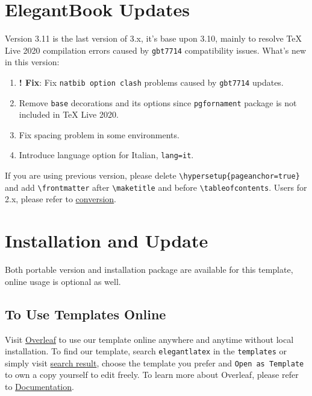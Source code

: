 \documentclass[11pt,fancy,twocol,twoside]{elegantbook}
\begin{document}
\section{ElegantBook Updates}

Version 3.11 is the last version of 3.x, it's base upon 3.10, mainly to resolve \TeX{} Live 2020 compilation errors caused by \lstinline{gbt7714} compatibility issues. What\rq s new in this version:

\begin{enumerate}
  \item \textbf{! Fix}: Fix \lstinline{natbib option clash} problems caused by \lstinline{gbt7714} updates.
  \item Remove \lstinline{base} decorations and its options since \lstinline{pgfornament} package is not included in \TeX{} Live 2020.
  \item Fix spacing problem in some environments.
  \item Introduce language option for Italian, \lstinline{lang=it}.
\end{enumerate}


\begin{note}
  If you are using previous version, please delete \lstinline|\hypersetup{pageanchor=true}| and add \lstinline{\frontmatter} after \lstinline{\maketitle} and before \lstinline{\tableofcontents}. Users for 2.x, please refer to \href{https://github.com/ElegantLaTeX/ElegantBook/wiki/convert}{conversion}.
\end{note}

\section{Installation and Update}
Both portable version and installation package are available for this template, online usage is optional as well.

\subsection{To Use Templates Online}
Visit \href{https://www.overleaf.com/}{Overleaf} to use our template online anywhere and anytime without local installation. To find our template, search \lstinline{elegantlatex} in the \lstinline{templates} or simply visit \href{https://www.overleaf.com/latex/templates?addsearch=elegantlatex}{search result}, choose the template you prefer and \lstinline{Open as Template} to own a copy yourself to edit freely. To learn more about Overleaf, please refer to \href{https://www.overleaf.com/learn}{Documentation}.
\end{document}
